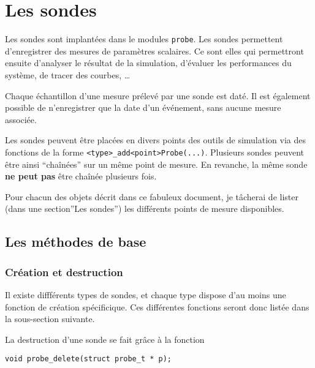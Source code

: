%
\section{Les sondes}
\label{section:sondes}

   Les sondes sont implantées dans le modules {\tt probe}. Les sondes
permettent d'enregistrer des mesures de paramètres scalaires. Ce sont
elles qui permettront ensuite d'analyser le résultat de la simulation,
d'évaluer les performances du système, de tracer des courbes, \ldots

   Chaque échantillon d'une mesure prélevé par une sonde est daté. Il
est également possible de n'enregistrer que la date d'un événement,
sans aucune mesure associée.

   Les sondes peuvent être placées en divers points des outils de
simulation via des fonctions de la forme
\lstinline!<type>_add<point>Probe(...)!. Plusieurs sondes peuvent être
ainsi ``chaînées'' sur un même point de mesure. En revanche, la même
sonde {\bf ne peut pas} être chaînée plusieurs fois.

   Pour chacun des objets décrit dans ce fabuleux document, je
tâcherai de lister (dans une section''Les sondes'') les différents
points de mesure disponibles.

%
\subsection{Les méthodes de base}

%
\subsubsection{Création et destruction}

   Il existe diffférents types de sondes, et chaque type dispose d'au
moins une fonction de création spécificique. Ces différentes fonctions
seront donc listée dans la sous-section suivante.

   La destruction d'une sonde se fait grâce à la fonction 

\begin{verbatim}
void probe_delete(struct probe_t * p);
\end{verbatim}

